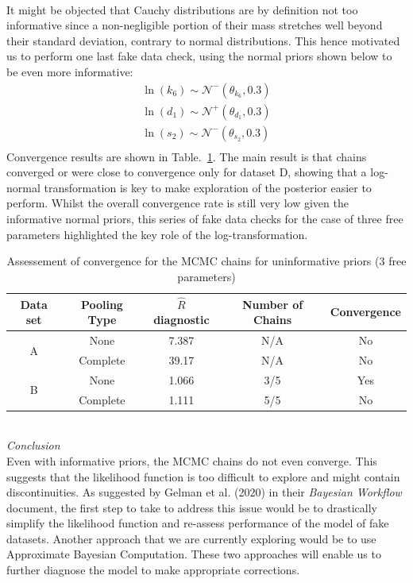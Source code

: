 \documentclass[11pt]{article}
\begin{document}
\\[12pt]
It might be objected that Cauchy distributions are by definition not too informative since a non-negligible portion of their mass stretches well beyond their standard deviation, contrary to normal distributions. This hence motivated us to perform one last fake data check, using the normal priors shown below to be even more informative: 
\begin{align*}
    \ln(k_6) \sim \mathcal{N}^-(\theta_{k_6}, 0.3) \\ 
    \ln(d_1) \sim \mathcal{N}^+(\theta_{d_1}, 0.3) \\ 
    \ln(s_2) \sim \mathcal{N}^-(\theta_{s_2}, 0.3) \\ 
\end{align*}
Convergence results are shown in Table.~\ref{tbl:rhat_4}. The main result is that chains converged or were close to convergence only for dataset D, showing that a log-normal transformation is key to make exploration of the posterior easier to perform. Whilst the overall convergence rate is still very low given the informative normal priors, this series of fake data checks for the case of three free parameters highlighted the key role of the log-transformation.

\begin{table}[!h]
    \centering
    \caption{Assessement of convergence for the MCMC chains for uninformative priors (3 free parameters)}
    \begin{tabular}{c|c||c|c|c}
        \hline
        Data set & Pooling Type & $\hat{R}$ diagnostic & Number of Chains & Convergence  \\ \hline 
        \multirow{2}{*}{A}      & None     & 7.387 & N/A & No \\
                                & Complete & 39.17 & N/A & No \\ \hline 
        \multirow{2}{*}{B}      & None     & 1.066 & 3/5 & Yes \\
                                & Complete & 1.111 & 5/5 & No \\ \hline 
    \end{tabular}
    \label{tbl:rhat_4}
\end{table}
~\\
\textit{Conclusion}\\[5pt]
Even with informative priors, the MCMC chains do not even converge. This suggests that the likelihood function is too difficult to explore and might contain discontinuities. As suggested by Gelman et al. (2020) in their \textit{Bayesian Workflow} document, the first step to take to address this issue would be to drastically simplify the likelihood function and re-assess performance of the model of fake datasets. Another approach that we are currently exploring would be to use Approximate Bayesian Computation. These two approaches will enable us to further diagnose the model to make appropriate corrections.
\end{document}
